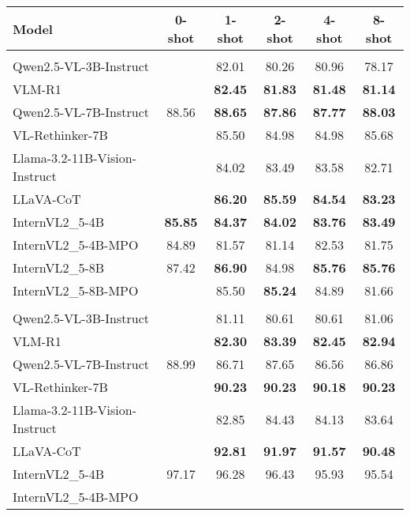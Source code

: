 \begin{table}[t]
\centering
\small
\begin{tabular}{lccccc}
\toprule
\textbf{Model} & 0-shot & 1-shot & 2-shot & 4-shot & 8-shot \\
\midrule
\rowcolor{gray!20} \multicolumn{6}{c}{\textbf{A-OKVQA}} \\
{Qwen2.5-VL-3B-Instruct} &  & 82.01 & 80.26 & 80.96 & 78.17 \\
{VLM-R1} &  & \textbf{82.45} & \textbf{81.83} & \textbf{81.48} & \textbf{81.14} \\
\midrule
{Qwen2.5-VL-7B-Instruct} & 88.56 & \textbf{88.65} & \textbf{87.86} & \textbf{87.77} & \textbf{88.03} \\
{VL-Rethinker-7B} &  & 85.50 & 84.98 & 84.98 & 85.68 \\
\midrule
{Llama-3.2-11B-Vision-Instruct} &  & 84.02 & 83.49 & 83.58 & 82.71 \\
{LLaVA-CoT} &  & \textbf{86.20} & \textbf{85.59} & \textbf{84.54} & \textbf{83.23} \\
\midrule
{InternVL2\_5-4B} & \textbf{85.85} & \textbf{84.37} & \textbf{84.02} & \textbf{83.76} & \textbf{83.49} \\
{InternVL2\_5-4B-MPO} & 84.89 & 81.57 & 81.14 & 82.53 & 81.75 \\
\midrule
{InternVL2\_5-8B} & 87.42 & \textbf{86.90} & 84.98 & \textbf{85.76} & \textbf{85.76} \\
{InternVL2\_5-8B-MPO} &  & 85.50 & \textbf{85.24} & 84.89 & 81.66 \\
\midrule
\rowcolor{gray!20} \multicolumn{6}{c}{\textbf{ScienceQA}} \\
{Qwen2.5-VL-3B-Instruct} &  & 81.11 & 80.61 & 80.61 & 81.06 \\
{VLM-R1} &  & \textbf{82.30} & \textbf{83.39} & \textbf{82.45} & \textbf{82.94} \\
\midrule
{Qwen2.5-VL-7B-Instruct} & 88.99 & 86.71 & 87.65 & 86.56 & 86.86 \\
{VL-Rethinker-7B} &  & \textbf{90.23} & \textbf{90.23} & \textbf{90.18} & \textbf{90.23} \\
\midrule
{Llama-3.2-11B-Vision-Instruct} &  & 82.85 & 84.43 & 84.13 & 83.64 \\
{LLaVA-CoT} &  & \textbf{92.81} & \textbf{91.97} & \textbf{91.57} & \textbf{90.48} \\
\midrule
{InternVL2\_5-4B} & 97.17 & 96.28 & 96.43 & 95.93 & 95.54 \\
{InternVL2\_5-4B-MPO} &  &  &  &  &  \\

\end{tabular}
\end{table}
